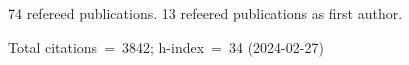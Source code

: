 74 refereed publications. 13 refeered publications as first author.

Total citations~=~3842; h-index~=~34 (2024-02-27)